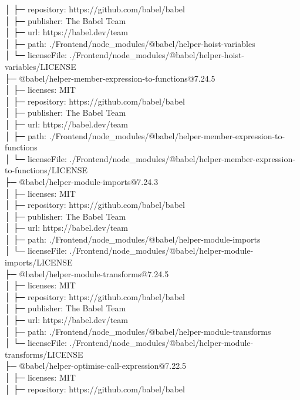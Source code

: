 │  ├─ repository: https://github.com/babel/babel\\
│  ├─ publisher: The Babel Team\\
│  ├─ url: https://babel.dev/team\\
│  ├─ path: ./Frontend/node\_modules/@babel/helper-hoist-variables\\
│  └─ licenseFile: ./Frontend/node\_modules/@babel/helper-hoist-variables/LICENSE\\
├─ @babel/helper-member-expression-to-functions@7.24.5\\
│  ├─ licenses: MIT\\
│  ├─ repository: https://github.com/babel/babel\\
│  ├─ publisher: The Babel Team\\
│  ├─ url: https://babel.dev/team\\
│  ├─ path: ./Frontend/node\_modules/@babel/helper-member-expression-to-functions\\
│  └─ licenseFile: ./Frontend/node\_modules/@babel/helper-member-expression-to-functions/LICENSE\\
├─ @babel/helper-module-imports@7.24.3\\
│  ├─ licenses: MIT\\
│  ├─ repository: https://github.com/babel/babel\\
│  ├─ publisher: The Babel Team\\
│  ├─ url: https://babel.dev/team\\
│  ├─ path: ./Frontend/node\_modules/@babel/helper-module-imports\\
│  └─ licenseFile: ./Frontend/node\_modules/@babel/helper-module-imports/LICENSE\\
├─ @babel/helper-module-transforms@7.24.5\\
│  ├─ licenses: MIT\\
│  ├─ repository: https://github.com/babel/babel\\
│  ├─ publisher: The Babel Team\\
│  ├─ url: https://babel.dev/team\\
│  ├─ path: ./Frontend/node\_modules/@babel/helper-module-transforms\\
│  └─ licenseFile: ./Frontend/node\_modules/@babel/helper-module-transforms/LICENSE\\
├─ @babel/helper-optimise-call-expression@7.22.5\\
│  ├─ licenses: MIT\\
│  ├─ repository: https://github.com/babel/babel\\
